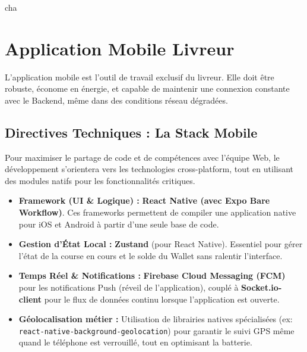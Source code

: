 \newpage







cha\section{Application Mobile Livreur}
\label{sec:application_mobile}

L'application mobile est l'outil de travail exclusif du livreur. Elle doit être robuste, économe en énergie, et capable de maintenir une connexion constante avec le Backend, même dans des conditions réseau dégradées.

\subsection{Directives Techniques : La Stack Mobile}

Pour maximiser le partage de code et de compétences avec l'équipe Web, le développement s'orientera vers les technologies cross-platform, tout en utilisant des modules natifs pour les fonctionnalités critiques.

\begin{itemize}
    \item \textbf{Framework (UI \& Logique) :} \textbf{React Native (avec Expo Bare Workflow)}. Ces frameworks permettent de compiler une application native pour iOS et Android à partir d'une seule base de code.
    \item \textbf{Gestion d'État Local :} \textbf{Zustand} (pour React Native). Essentiel pour gérer l'état de la course en cours et le solde du Wallet sans ralentir l'interface.
    \item \textbf{Temps Réel \& Notifications :} \textbf{Firebase Cloud Messaging (FCM)} pour les notifications Push (réveil de l'application), couplé à \textbf{Socket.io-client} pour le flux de données continu lorsque l'application est ouverte.
    \item \textbf{Géolocalisation métier :} Utilisation de librairies natives spécialisées (ex: \texttt{react-native-background-geolocation}) pour garantir le suivi GPS même quand le téléphone est verrouillé, tout en optimisant la batterie.
\end{itemize}

